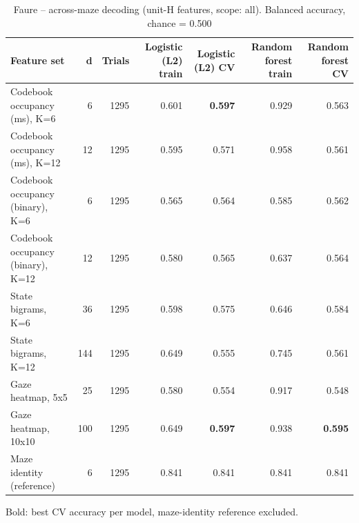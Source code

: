 \begin{table}[t]
\centering
\caption{Faure -- across-maze decoding (unit-H features, scope: all). Balanced accuracy, chance = 0.500}
\label{tab:crossmaze_Faure}
\begin{tabular}{lrrrrrr}
\toprule
Feature set & d & Trials & Logistic (L2) train & Logistic (L2) CV & Random forest train & Random forest CV \\
\midrule
Codebook occupancy (ms), K=6 & 6 & 1295 & 0.601 & \textbf{0.597} & 0.929 & 0.563 \\
Codebook occupancy (ms), K=12 & 12 & 1295 & 0.595 & 0.571 & 0.958 & 0.561 \\
Codebook occupancy (binary), K=6 & 6 & 1295 & 0.565 & 0.564 & 0.585 & 0.562 \\
Codebook occupancy (binary), K=12 & 12 & 1295 & 0.580 & 0.565 & 0.637 & 0.564 \\
State bigrams, K=6 & 36 & 1295 & 0.598 & 0.575 & 0.646 & 0.584 \\
State bigrams, K=12 & 144 & 1295 & 0.649 & 0.555 & 0.745 & 0.561 \\
Gaze heatmap, 5x5 & 25 & 1295 & 0.580 & 0.554 & 0.917 & 0.548 \\
Gaze heatmap, 10x10 & 100 & 1295 & 0.649 & \textbf{0.597} & 0.938 & \textbf{0.595} \\
Maze identity (reference) & 6 & 1295 & 0.841 & 0.841 & 0.841 & 0.841 \\
\bottomrule
\end{tabular}
\par\smallskip
{\footnotesize Bold: best CV accuracy per model, maze-identity reference excluded.}
\end{table}
